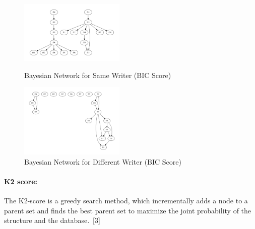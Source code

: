 \documentclass{article}
\begin{document}
    \begin{figure}[h]
  \begin{minipage}{0.48\textwidth}
  \centering
  \includegraphics[width=50mm,scale=0.5]{bayesian_yes_BIC.jpg}
  \caption{Bayesian Network for Same Writer (BIC Score)}
  \end{minipage}\hfill
  \begin{minipage}{0.48\textwidth}
  \centering
  \includegraphics[width=50mm,scale=0.5]{bayesian_no_BIC.jpg}
  \caption{Bayesian Network for Different Writer (BIC Score)}
  \end{minipage}
\end{figure}
    
    \paragraph{K2 score:}
    The K2-score is a greedy search method, which incrementally adds a node to a parent set and finds the best parent set to maximize the joint probability of the structure and the database.\ [3]
    
\end{document}
